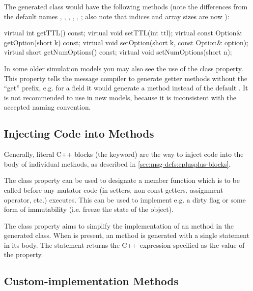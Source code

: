 The generated class would have the following methods (note the differences
from the default names , , ,
, , ;
also note that indices and array sizes are now ):

\begin{cpp}
virtual int getTTL() const;
virtual void setTTL(int ttl);
virtual const Option& getOption(short k) const;
virtual void setOption(short k, const Option& option);
virtual short getNumOptions() const;
virtual void setNumOptions(short n);
\end{cpp}

In some older simulation models you may also see the use of the
 class property. This property tells the message
compiler to generate getter methods without the ``get'' prefix, e.g. for a
 field it would generate a  method
instead of the default . It is not recommended to
use  in new models, because it is inconsistent with the
accepted naming convention.



\subsection{Injecting Code into Methods}
\label{sec:msg-defs:injecting-code-into-methods}

Generally, literal C++ blocks (the  keyword) are the way to
inject code into the body of individual methods, as described in
\ref{sec:msg-defs:cplusplus-blocks}.

The  class property can be used to designate a member function
which is to be called before any mutator code (in setters, non-const getters,
assignment operator, etc.) executes. This can be used to implement e.g. a dirty
flag or some form of immutability (i.e. freeze the state of the object).

The  class property aims to simplify the implementation of an
 method in the generated class. When  is present, an
 method is generated with a single 
statement in its body. The statement returns the C++ expression specified as the
value of the  property.


\subsection{Custom-implementation Methods}
\label{sec:msg-defs:customimpl-fields}

